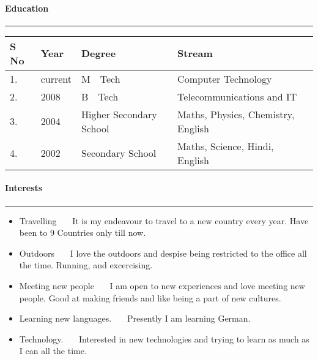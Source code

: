 \documentclass[12pt]{article}
\begin{document}
\paragraph{Education}
\vspace{2mm}
\rule {12.5cm}{2pt} \hfill
\begin{tabular}{|l|l|l|l|}
	\hline
	\textbf{S No} & \textbf{Year} & \textbf{Degree} & \textbf{Stream}\\
	\hline
	1.&current &M\ \ Tech & Computer Technology\\
	\hline
	2.&2008 &B\ \ Tech &Telecommunications and IT\\
	\hline
	3. &2004 & Higher Secondary School & Maths, Physics, Chemistry, English \\
	\hline
	4. & 2002 & Secondary School & Maths, Science, Hindi, English\\
	\hline
\end{tabular}

\paragraph{Interests} \hfill
\vspace{2mm}
\rule {12.5cm}{2pt} 
\begin{itemize}
	\item Travelling \ \ \ It is my endeavour to travel to a new country every year. Have been to  9 Countries only till now.
	\item Outdoors  \ \ \ I love the outdoors and despise being restricted to the office all the time. Running, and excercising.
	\item Meeting new people  \ \ \ I am open to new experiences and love meeting new people. Good at making friends and like being a part of new cultures.
	\item Learning new languages. \ \ \  Presently I am learning German.
	\item Technology. \ \ \ Interested in new technologies and trying to learn as much as I can all the time.
\end{itemize}

	


 
\end{document}
